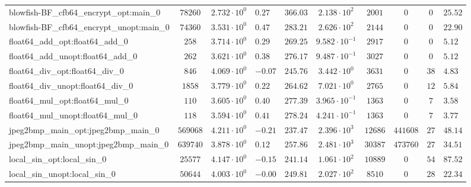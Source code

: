 \begin{tabular}{|l|c|HHc|c|c|c|cH|}
blowfish-BF\_cfb64\_encrypt\_opt:main\_0        & $ 78260    $ & $ 2.732 \cdot 10^{0} $ & $ 0.27  $ & $ 366.03 $ & $ 2.138 \cdot 10^{2}  $ & $ 2001   $ & $ 0       $ & $ 0   $ & $ 25.52   $ \\
blowfish-BF\_cfb64\_encrypt\_unopt:main\_0      & $ 74360    $ & $ 3.531 \cdot 10^{0} $ & $ 0.47  $ & $ 283.21 $ & $ 2.626 \cdot 10^{2}  $ & $ 2144   $ & $ 0       $ & $ 0   $ & $ 22.90   $ \\
float64\_add\_opt:float64\_add\_0               & $ 258      $ & $ 3.714 \cdot 10^{0} $ & $ 0.29  $ & $ 269.25 $ & $ 9.582 \cdot 10^{-1} $ & $ 2917   $ & $ 0       $ & $ 0   $ & $ 5.12    $ \\
float64\_add\_unopt:float64\_add\_0             & $ 262      $ & $ 3.621 \cdot 10^{0} $ & $ 0.38  $ & $ 276.17 $ & $ 9.487 \cdot 10^{-1} $ & $ 3027   $ & $ 0       $ & $ 0   $ & $ 5.12    $ \\
float64\_div\_opt:float64\_div\_0               & $ 846      $ & $ 4.069 \cdot 10^{0} $ & $ -0.07 $ & $ 245.76 $ & $ 3.442 \cdot 10^{0}  $ & $ 3631   $ & $ 0       $ & $ 38  $ & $ 4.83    $ \\
float64\_div\_unopt:float64\_div\_0             & $ 1858     $ & $ 3.779 \cdot 10^{0} $ & $ 0.22  $ & $ 264.62 $ & $ 7.021 \cdot 10^{0}  $ & $ 2765   $ & $ 0       $ & $ 12  $ & $ 5.84    $ \\
float64\_mul\_opt:float64\_mul\_0               & $ 110      $ & $ 3.605 \cdot 10^{0} $ & $ 0.40  $ & $ 277.39 $ & $ 3.965 \cdot 10^{-1} $ & $ 1363   $ & $ 0       $ & $ 7   $ & $ 3.58    $ \\
float64\_mul\_unopt:float64\_mul\_0             & $ 118      $ & $ 3.594 \cdot 10^{0} $ & $ 0.41  $ & $ 278.24 $ & $ 4.241 \cdot 10^{-1} $ & $ 1363   $ & $ 0       $ & $ 7   $ & $ 3.77    $ \\
jpeg2bmp\_main\_opt:jpeg2bmp\_main\_0           & $ 569068   $ & $ 4.211 \cdot 10^{0} $ & $ -0.21 $ & $ 237.47 $ & $ 2.396 \cdot 10^{3}  $ & $ 12686  $ & $ 441608  $ & $ 27  $ & $ 48.14   $ \\
jpeg2bmp\_main\_unopt:jpeg2bmp\_main\_0         & $ 639740   $ & $ 3.878 \cdot 10^{0} $ & $ 0.12  $ & $ 257.86 $ & $ 2.481 \cdot 10^{3}  $ & $ 30387  $ & $ 473760  $ & $ 27  $ & $ 34.51   $ \\
local\_sin\_opt:local\_sin\_0                   & $ 25577    $ & $ 4.147 \cdot 10^{0} $ & $ -0.15 $ & $ 241.14 $ & $ 1.061 \cdot 10^{2}  $ & $ 10889  $ & $ 0       $ & $ 54  $ & $ 87.52   $ \\
local\_sin\_unopt:local\_sin\_0                 & $ 50644    $ & $ 4.003 \cdot 10^{0} $ & $ -0.00 $ & $ 249.81 $ & $ 2.027 \cdot 10^{2}  $ & $ 8510   $ & $ 0       $ & $ 28  $ & $ 22.34   $ \\

\end{tabular}
